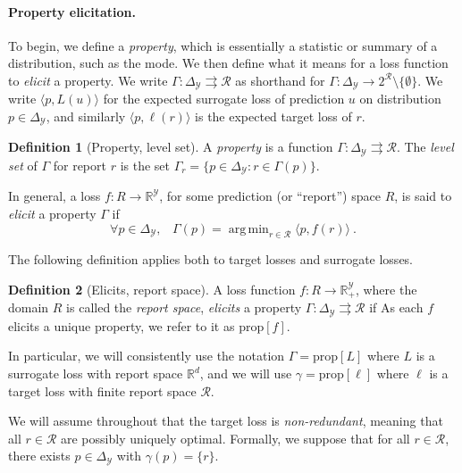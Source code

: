 \documentclass{article}
\theoremstyle{definition}\newtheorem{definition}{Definition}
\theoremstyle{definition}\newtheorem{assumption}{Assumption}
\DeclareMathOperator*{\argmin}{arg\,min}
\newcommand{\reals}{\mathbb{R}}
\newcommand{\prop}[1]{\mathrm{prop}[#1]}
\newcommand{\simplex}{\Delta_\Y}
\newcommand{\R}{\mathcal{R}}
\newcommand{\Y}{\mathcal{Y}}
\newcommand{\inprod}[2]{\langle #1, #2 \rangle}%
\newcommand{\toto}{\rightrightarrows}
\begin{document}
\paragraph{Property elicitation.}
To begin, we define a \emph{property}, which is essentially a statistic or summary of a distribution, such as the mode.
We then define what it means for a loss function to \emph{elicit} a property.
We write $\Gamma: \simplex \toto \R$ as shorthand for $\Gamma: \simplex \to 2^{\R} \setminus \{\emptyset\}$.
We write $\inprod{p}{L(u)}$ for the expected surrogate loss of prediction $u$ on distribution $p \in \simplex$, and similarly $\inprod{p}{\ell(r)}$ is the expected target loss of $r$.


\begin{definition}[Property, level set]\label{def:property}
  A \emph{property} is a function $\Gamma:\simplex\toto\R$.
  The \emph{level set} of $\Gamma$ for report $r$ is the set $\Gamma_r = \{p \in \simplex : r \in \Gamma(p)\}$.
\end{definition}
In general, a loss $f: R \to \reals^{\Y}$, for some prediction (or ``report'') space $R$, is said to \emph{elicit} a property $\Gamma$ if
\begin{equation}
  \forall p\in\simplex,\;\;\;\Gamma(p) = \argmin_{r \in \R} \inprod{p}{f(r)}~.
\end{equation}

The following definition applies both to target losses and surrogate losses.
\begin{definition}[Elicits, report space]
  \label{def:elicits}
  A loss function $f:R\to\reals^\Y_+$, where the domain $R$ is called the \emph{report space}, \emph{elicits} a property $\Gamma:\simplex \toto \R$ if
  As each $f$ elicits a unique property, we refer to it as $\prop{f}$.
\end{definition}
In particular, we will consistently use the notation $\Gamma = \prop{L}$ where $L$ is a surrogate loss with report space $\reals^d$, and we will use $\gamma = \prop{\ell}$ where $\ell$ is a target loss with finite report space $\R$.

We will assume throughout that the target loss is \emph{non-redundant}, meaning that all $r \in \R$ are possibly uniquely optimal.
Formally, we suppose that for all $r \in \R$, there exists $p \in \simplex$ with $\gamma(p) = \{r\}$.
\end{document}
